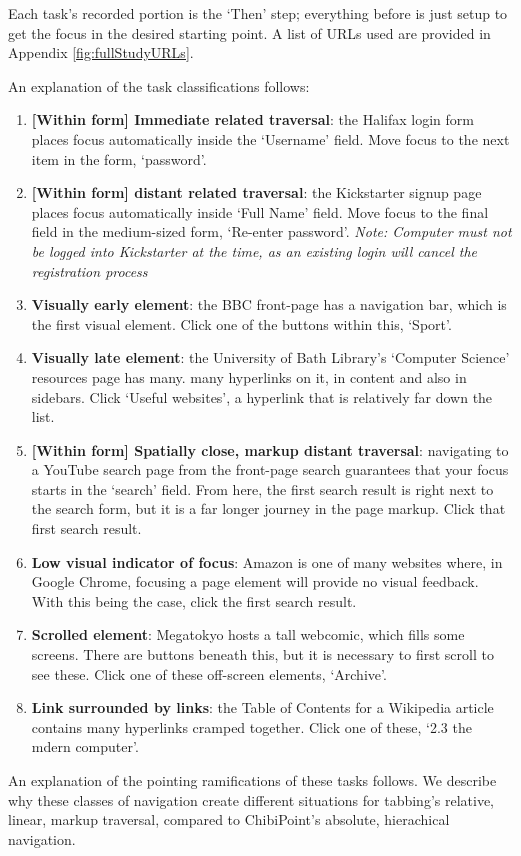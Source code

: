 \documentclass[a4paper, 12pt]{report}
\begin{document}
Each task's recorded portion is the `Then' step; everything before is just setup to get the focus in the desired starting point. A list of URLs used are provided in Appendix \ref{fig:fullStudyURLs}.

An explanation of the task classifications follows:

\newcommand{\TaskDef}[2]{\item \textbf{#1}: #2}

\begin{enumerate}
	\TaskDef{[Within form] Immediate related traversal}{the Halifax login form places focus automatically inside the `Username' field. Move focus to the next item in the form, `password'.}
	\TaskDef{[Within form] distant related traversal}{the Kickstarter signup page places focus automatically inside `Full Name' field. Move focus to the final field in the medium-sized form, `Re-enter password'. \textit{Note: Computer must not be logged into Kickstarter at the time, as an existing login will cancel the registration process}}
	\TaskDef{Visually early element}{the BBC front-page has a navigation bar, which is the first visual element. Click one of the buttons within this, `Sport'.}
	\TaskDef{Visually late element}{the University of Bath Library's `Computer Science' resources page has many. 
	many hyperlinks on it, in content and also in sidebars. Click `Useful websites', a hyperlink that is relatively far down the list.}
	\TaskDef{[Within form] Spatially close, markup distant traversal}{navigating to a YouTube search page from the front-page search guarantees that your focus starts in the `search' field. From here, the first search result is right next to the search form, but it is a far longer journey in the page markup. Click that first search result.}
	\TaskDef{Low visual indicator of focus}{Amazon is one of many websites where, in Google Chrome, focusing a page element will provide no visual feedback. With this being the case, click the first search result.}
	\TaskDef{Scrolled element}{Megatokyo hosts a tall webcomic, which fills some screens. There are buttons beneath this, but it is necessary to first scroll to see these. Click one of these off-screen elements, `Archive'.}
	\TaskDef{Link surrounded by links}{the Table of Contents for a Wikipedia article contains many hyperlinks cramped together. Click one of these, `2.3 the mdern computer'.}
\end{enumerate}

An explanation of the pointing ramifications of these tasks follows. We describe why these classes of navigation create different situations for tabbing's relative, linear, markup traversal, compared to ChibiPoint's absolute, hierachical navigation.
\end{document}
